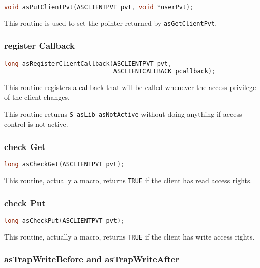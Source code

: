 \begin{lstlisting}[language=C]
void asPutClientPvt(ASCLIENTPVT pvt, void *userPvt); 
\end{lstlisting}

This routine is used to set the pointer returned by \verb|asGetClientPvt|.

\subsubsection{register Callback}

\begin{lstlisting}[language=C]
long asRegisterClientCallback(ASCLIENTPVT pvt,
                              ASCLIENTCALLBACK pcallback);
\end{lstlisting}

This routine registers a callback that will be called whenever the access privilege of the client changes.

This routine returns \verb|S_asLib_asNotActive| without doing anything if access control is not active.

\subsubsection{check Get}

\begin{lstlisting}[language=C]
long asCheckGet(ASCLIENTPVT pvt); 
\end{lstlisting}

This routine, actually a macro, returns \verb|TRUE| if the client has read access rights.

\subsubsection{check Put}

\begin{lstlisting}[language=C]
long asCheckPut(ASCLIENTPVT pvt);
\end{lstlisting}

This routine, actually a macro, returns \verb|TRUE| if the client has write access rights.

\subsubsection{asTrapWriteBefore and asTrapWriteAfter}

